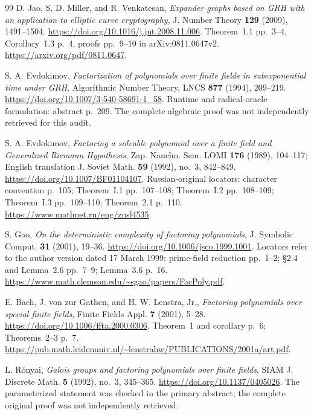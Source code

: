 \documentclass[11pt,a4paper]{article}
\begin{document}
\begin{thebibliography}{99}
D. Jao, S. D. Miller, and R. Venkatesan,
\emph{Expander graphs based on GRH with an application to elliptic curve cryptography},
J. Number Theory \textbf{129} (2009), 1491--1504.
\url{https://doi.org/10.1016/j.jnt.2008.11.006}.
Theorem~1.1 pp.~3--4, Corollary~1.3 p.~4, proofs pp.~9--10
in arXiv:0811.0647v2.
\url{https://arxiv.org/pdf/0811.0647}.



S. A. Evdokimov,
\emph{Factorization of polynomials over finite fields in subexponential time under GRH},
Algorithmic Number Theory, LNCS \textbf{877} (1994), 209--219.
\url{https://doi.org/10.1007/3-540-58691-1_58}.
Runtime and radical-oracle formulation: abstract p.~209.
The complete algebraic proof was not independently retrieved for this audit.



S. A. Evdokimov,
\emph{Factoring a solvable polynomial over a finite field and Generalized Riemann Hypothesis},
Zap. Nauchn. Sem. LOMI \textbf{176} (1989), 104--117;
English translation J. Soviet Math. \textbf{59} (1992), no.~3, 842--849.
\url{https://doi.org/10.1007/BF01104107}.
Russian-original locators: character convention p.~105;
Theorem~I.1 pp.~107--108; Theorem~I.2 pp.~108--109;
Theorem~I.3 pp.~109--110; Theorem~2.1 p.~110.
\url{https://www.mathnet.ru/eng/znsl4535}.



S. Gao, \emph{On the deterministic complexity of factoring polynomials},
J. Symbolic Comput. \textbf{31} (2001), 19--36.
\url{https://doi.org/10.1006/jsco.1999.1001}.
Locators refer to the author version dated 17 March 1999:
prime-field reduction pp.~1--2; \S2.4 and Lemma~2.6 pp.~7--9;
Lemma~3.6 p.~16.
\url{https://www.math.clemson.edu/~sgao/papers/FacPoly.pdf}.



E. Bach, J. von zur Gathen, and H. W. Lenstra, Jr.,
\emph{Factoring polynomials over special finite fields},
Finite Fields Appl. \textbf{7} (2001), 5--28.
\url{https://doi.org/10.1006/ffta.2000.0306}.
Theorem~1 and corollary p.~6; Theorems~2--3 p.~7.
\url{https://pub.math.leidenuniv.nl/~lenstrahw/PUBLICATIONS/2001a/art.pdf}.



L. R\'onyai, \emph{Galois groups and factoring polynomials over finite fields},
SIAM J. Discrete Math. \textbf{5} (1992), no.~3, 345--365.
\url{https://doi.org/10.1137/0405026}.
The parameterized statement was checked in the primary abstract;
the complete original proof was not independently retrieved.




\end{thebibliography}
\end{document}
